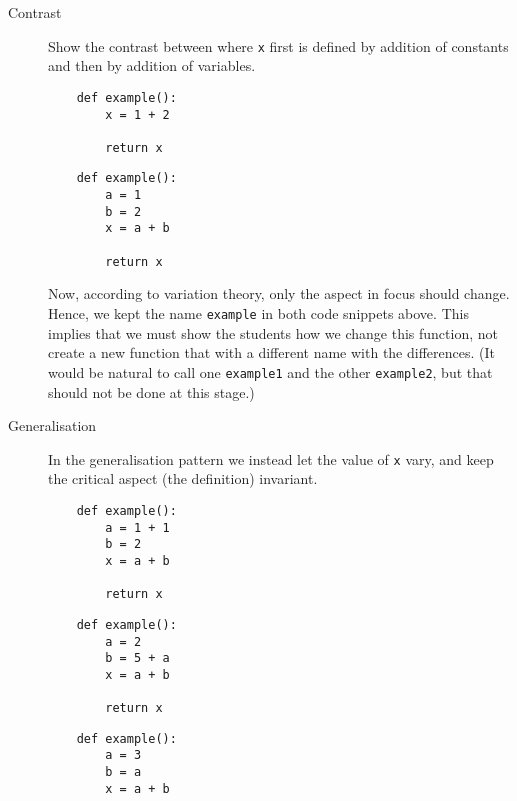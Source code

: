 \begin{description}
  \item [Contrast] Show the contrast between where \texttt{x} first 
    is defined by addition of constants and then by addition of variables.

\begin{minipage}[t]{0.45\columnwidth}
  \begin{verbatim}
    def example():
        x = 1 + 2

        return x
  \end{verbatim}
\end{minipage}
\hfill
\begin{minipage}[t]{0.45\columnwidth}
  \begin{verbatim}
    def example():
        a = 1
        b = 2
        x = a + b

        return x
  \end{verbatim}
\end{minipage}

    Now, according to variation theory, only the aspect in focus should change.
    Hence, we kept the name \texttt{example} in both code snippets 
    above.
    This implies that we must show the students how we change this function, 
    not create a new function that with a different name with the differences.
    (It would be natural to call one \texttt{example1} and the 
    other \texttt{example2}, but that should not be done at this 
    stage.)

    \item [Generalisation] In the generalisation pattern we instead let the 
      value of \texttt{x} vary, and keep the critical aspect (the 
      definition) invariant.

\begin{minipage}[t]{0.25\columnwidth}
  \begin{verbatim}
    def example():
        a = 1 + 1
        b = 2
        x = a + b

        return x
  \end{verbatim}
\end{minipage}
\hfill
\begin{minipage}[t]{0.25\columnwidth}
  \begin{verbatim}
    def example():
        a = 2
        b = 5 + a
        x = a + b

        return x
  \end{verbatim}
\end{minipage}
\hfill
\begin{minipage}[t]{0.25\columnwidth}
  \begin{verbatim}
    def example():
        a = 3
        b = a
        x = a + b


\end{verbatim}
\end{minipage}
\end{description}
